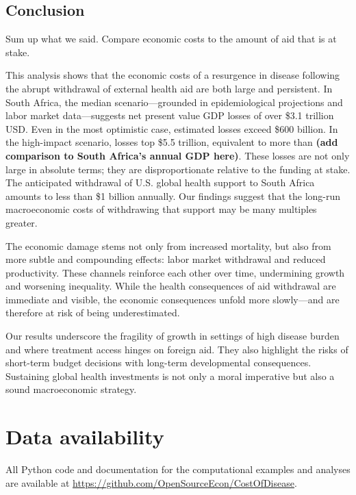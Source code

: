 \documentclass[letterpaper,12pt]{article}
\theoremstyle{definition}
\begin{document}
\begin{spacing}{1.5}
\section{Conclusion}\label{SecConc}

Sum up what we said.  Compare economic costs to the amount of aid that is at stake.


This analysis shows that the economic costs of a resurgence in disease following the abrupt withdrawal of external health aid are both large and persistent. In South Africa, the median scenario—grounded in epidemiological projections and labor market data—suggests net present value GDP losses of over \$3.1 trillion USD. Even in the most optimistic case, estimated losses exceed \$600 billion. In the high-impact scenario, losses top \$5.5 trillion, equivalent to more than \textbf{(add comparison to South Africa’s annual GDP here)}. These losses are not only large in absolute terms; they are disproportionate relative to the funding at stake. The anticipated withdrawal of U.S. global health support to South Africa amounts to less than \$1 billion annually. Our findings suggest that the long-run macroeconomic costs of withdrawing that support may be many multiples greater. 

The economic damage stems not only from increased mortality, but also from more subtle and compounding effects: labor market withdrawal and reduced productivity. These channels reinforce each other over time, undermining growth and worsening inequality. While the health consequences of aid withdrawal are immediate and visible, the economic consequences unfold more slowly—and are therefore at risk of being underestimated.

Our results underscore the fragility of growth in settings of high disease burden and where treatment access hinges on foreign aid. They also highlight the risks of short-term budget decisions with long-term developmental consequences. Sustaining global health investments is not only a moral imperative but also a sound macroeconomic strategy.


\end{spacing}

\section*{Data availability}

All Python code and documentation for the computational examples and analyses are available at \href{https://github.com/OpenSourceEcon/CostOfDisease}{https://github.com/OpenSourceEcon/CostOfDisease}.

\end{document}
